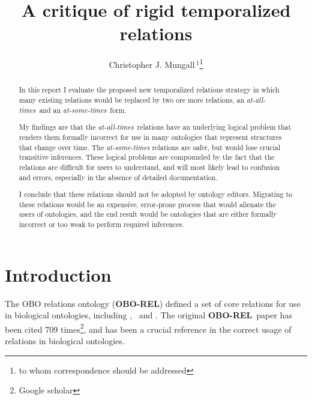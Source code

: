 \documentclass{bioinfo}
\def\partOf{\pr{part\_of}}
\def\isA{\pr{is\_a}}
\def\derivesFrom{\pr{derives\_from}}
\def\OBOREL{\textbf{OBO-REL}}
\begin{document}

\title{A critique of rigid temporalized relations}

\author{Christopher J. Mungall\,$^{1}$\footnote{to whom correspondence should be addressed}}
\address{$^{1}$Genomics Division, Lawrence Berkeley National Laboratory, MS84R017, 1 Cyclotron Road, Berkeley, CA 94720 USA}

\history{}

\editor{}

\maketitle

\begin{abstract}

  In this report I evaluate the proposed new temporalized relations
  strategy in which many existing relations would be replaced by two
  ore more relations, an \emph{at-all-times}\ and an \emph{at-some-times}\
  form.

  My findings are that the \emph{at-all-times}\ relations have an
  underlying logical problem that renders them formally incorrect for
  use in many ontologies that represent structures that change over
  time. The \emph{at-some-times} relations are safer, but would lose
  crucial transitive inferences. These logical problems are compounded
  by the fact that the relations are difficult for users to
  understand, and will most likely lead to confusion and errors,
  especially in the absence of detailed documentation.

  I conclude that these relations should not be adopted by ontology
  editors. Migrating to these relations would be an expensive,
  error-prone process that would alienate the users of ontologies, and
  the end result would be ontologies that are either formally
  incorrect or too weak to perform required inferences.

\end{abstract}

\section{Introduction}

The OBO relations ontology (\OBOREL) defined a set of core relations
for use in biological ontologies, including \isA, \partOf\ and
\derivesFrom\cite{Smith2005}. The original \OBOREL\ paper has been
cited 709 times\footnote{Google scholar}, and has been a crucial
reference in the correct usage of relations in biological ontologies.
\end{document}
